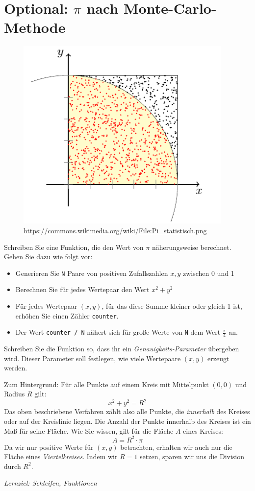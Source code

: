 \documentclass[
	ngerman,
	fontsize=10pt,
	parskip=half,
	titlepage=true,
	DIV=12
]{scrartcl}
\begin{document}
\section{Optional: $\pi$ nach Monte-Carlo-Methode}
\begin{figure}
\vspace{-20pt}
\includegraphics[width=\linewidth]{MCarlo}
\caption{\url{https://commons.wikimedia.org/wiki/File:Pi_statistisch.png}}
\vspace{-20pt}
\end{figure}
%
Schreiben Sie eine Funktion, die den Wert von $\pi$ näherungsweise berechnet. Gehen Sie dazu wie folgt vor:
\begin{itemize}
\item Generieren Sie \texttt{N} Paare von positiven Zufallszahlen $x, y$ zwischen 0 und 1
\item Berechnen Sie für jedes Wertepaar den Wert $x^2 + y^2$
\item Für jedes Wertepaar $(x, y)$, für das diese Summe kleiner oder gleich 1 ist, erhöhen Sie einen
	Zähler \texttt{counter}.
\item Der Wert \texttt{counter / N} nähert sich für große Werte von \texttt{N} dem Wert $\frac{\pi}{4}$
	an.
\end{itemize}

Schreiben Sie die Funktion so, dass ihr ein \emph{Genauigkeits-Parameter} übergeben wird. Dieser Parameter soll festlegen, wie viele Wertepaare $(x, y)$ erzeugt werden.

Zum Hintergrund:\newline
Für alle Punkte auf einem Kreis mit Mittelpunkt $(0,0)$ und Radius $R$ gilt:
\[ x^2 + y^2 = R^2\]
Das oben beschriebene Verfahren zählt also alle Punkte, die \emph{innerhalb} des Kreises oder auf der Kreislinie liegen. Die Anzahl der Punkte innerhalb des Kreises ist ein Maß für seine Fläche. Wie Sie wissen, gilt für die Fläche $A$ eines Kreises:
\[ A = R^2 \cdot \pi \]
Da wir nur positive Werte für $(x, y)$ betrachten, erhalten wir auch nur die Fläche eines \emph{Viertelkreises}. Indem wir $R=1$ setzen, sparen wir uns die Division durch $R^2$.

\emph{Lernziel: Schleifen, Funktionen}
\end{document}
